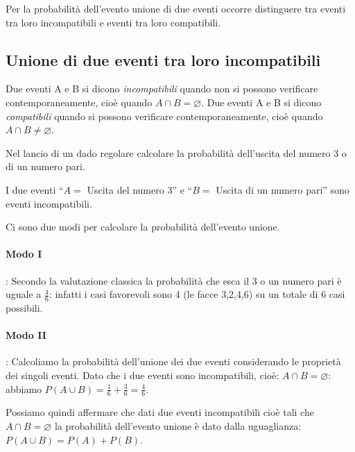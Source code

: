 Per la probabilità dell'evento unione di due eventi occorre distinguere tra 
eventi tra loro incompatibili e eventi tra loro compatibili.

\subsection[Unione di due eventi tra loro incompatibili]{Unione di due 
eventi 
tra loro incompatibili}

\begin{definizione}
Due eventi A e B si dicono \emph{incompatibili} quando non si possono 
verificare 
contemporaneamente, cioè quando $A\cap B=\varnothing $.
Due eventi A e B si dicono \emph{compatibili} quando si possono verificare 
contemporaneamente, cioè quando $A\cap B\neq \varnothing $.
\end{definizione}

\begin{esempio}
Nel lancio di un dado regolare calcolare la probabilità dell'uscita del 
numero 
3 
o di un numero pari.

I due eventi ``$ A= $ Uscita del numero 3'' e ``$ B= $ Uscita di un numero 
pari'' sono eventi incompatibili.

Ci sono due modi per calcolare la probabilità dell'evento unione.
\paragraph{Modo I}: Secondo la valutazione classica la probabilità che esca 
il 
$3$ o un numero pari è uguale a $\frac 4 6$: infatti i casi favorevoli sono 
4 
(le facce 3,2,4,6) su un totale di $6$ casi possibili.
\paragraph{Modo II}: Calcoliamo la probabilità dell'unione dei due eventi 
considerando le proprietà dei singoli eventi. Dato che i due eventi sono 
incompatibili, cioè: $A\cap B=\varnothing $: abbiamo $P(A\cup B)=\frac 1 
6+\frac 
3 
6=\frac 4 6$.
\begin{center}
 
\end{center}
\end{esempio}

Possiamo quindi affermare che dati due eventi incompatibili cioè tali che 
$A\cap 
B=\varnothing $ la probabilità dell'evento unione è dato dalla uguaglianza: 
$P(A\cup B)=P(A)+P(B)$.

